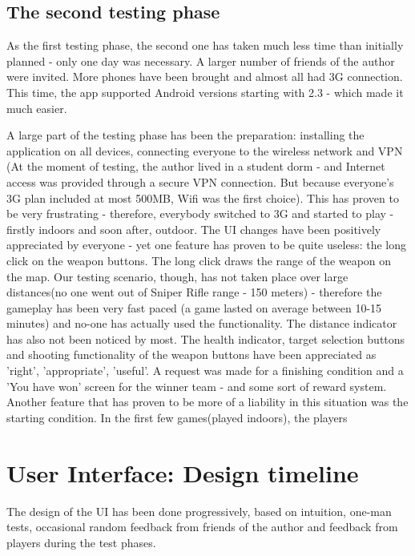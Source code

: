 \documentclass{article}
\begin{document}
\subsection{The second testing phase}

As the first testing phase, the second one has taken much less time than
initially planned - only one day was necessary. A larger number of friends of
the author were invited. More phones have been brought and almost all had 3G
connection. This time, the app supported Android versions starting with 2.3
- which made it much easier.\newline

A large part of the testing phase has been the preparation: installing the
application on all devices, connecting everyone to the wireless network and VPN
(At the moment of testing, the author lived in a student dorm - and Internet
access was provided through a secure VPN connection. But because everyone's 3G
plan included at most 500MB, Wifi was the first choice). This has proven to be
very frustrating - therefore, everybody switched to 3G and started to play -
firstly indoors and soon after, outdoor. The UI changes have been positively
appreciated by everyone - yet one feature has proven to be quite useless: the
long click on the weapon buttons. The long click draws the range of the weapon
on the map. Our testing scenario, though, has not taken place over large
distances(no one went out of Sniper Rifle range - 150 meters) - therefore the
gameplay has been very fast paced (a game lasted on average between 10-15
minutes) and no-one has actually used the functionality. The distance indicator
has also not been noticed by most. The health indicator, target selection
buttons and shooting functionality of the weapon buttons have been appreciated
as 'right', 'appropriate', 'useful'. A request was made for a finishing
condition and a 'You have won' screen for the winner team - and some sort of
reward system. Another feature that has proven to be more of a liability in this
situation was the starting condition. In the first few games(played indoors),
the players 

\section{User Interface: Design timeline}

The design of the UI has been done progressively, based on intuition, one-man
tests, occasional random feedback from friends of the author and feedback from
players during the test phases.\newline
\end{document}

